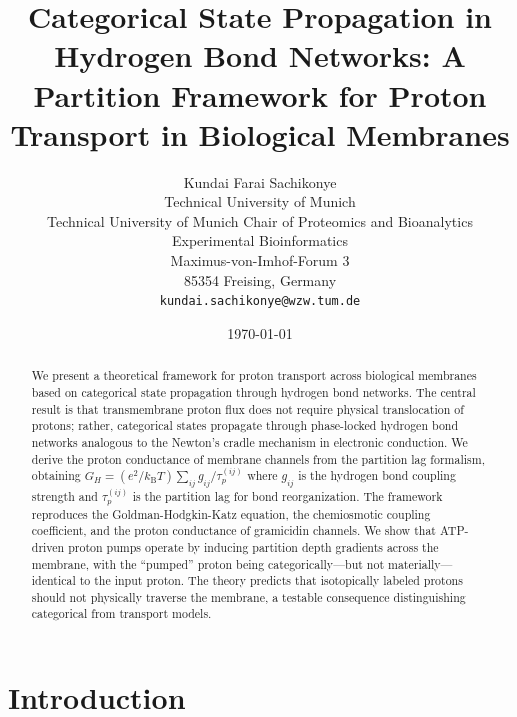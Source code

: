 \documentclass[twocolumn,showpacs,preprintnumbers,amsmath,amssymb,prd]{revtex4-2}
\newcommand{\taup}{\tau_p}
\newcommand{\kB}{k_{\text{B}}}
\begin{document}
\title{Categorical State Propagation in Hydrogen Bond Networks: A Partition Framework for Proton Transport in Biological Membranes}

\author{
Kundai Farai Sachikonye\\
Technical University of Munich\\
Technical University of Munich Chair of Proteomics and Bioanalytics \\
Experimental Bioinformatics \\
Maximus-von-Imhof-Forum 3\\
85354 Freising, Germany\\
\texttt{kundai.sachikonye@wzw.tum.de}
}

\date{\today}

\begin{abstract}
We present a theoretical framework for proton transport across biological membranes based on categorical state propagation through hydrogen bond networks. The central result is that transmembrane proton flux does not require physical translocation of protons; rather, categorical states propagate through phase-locked hydrogen bond networks analogous to the Newton's cradle mechanism in electronic conduction. We derive the proton conductance of membrane channels from the partition lag formalism, obtaining $G_H = (e^2/\kB T)\sum_{ij}g_{ij}/\taup^{(ij)}$ where $g_{ij}$ is the hydrogen bond coupling strength and $\taup^{(ij)}$ is the partition lag for bond reorganization. The framework reproduces the Goldman-Hodgkin-Katz equation, the chemiosmotic coupling coefficient, and the proton conductance of gramicidin channels. We show that ATP-driven proton pumps operate by inducing partition depth gradients across the membrane, with the ``pumped'' proton being categorically---but not materially---identical to the input proton. The theory predicts that isotopically labeled protons should not physically traverse the membrane, a testable consequence distinguishing categorical from transport models.
\end{abstract}


\maketitle

\section{Introduction}
\label{sec:introduction}
\end{document}
